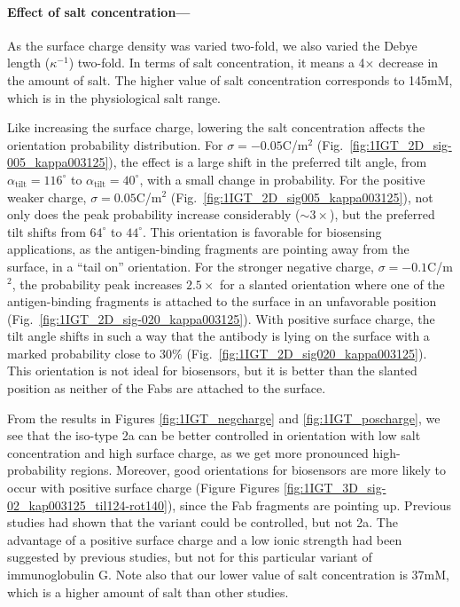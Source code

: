  \medskip
 
 \paragraph*{Effect of salt concentration---}
 
As the surface charge density was varied two-fold, we also varied the Debye length ($\kappa^{-1}$) two-fold. In terms of salt concentration, it means a 4$\times$ decrease in the amount of salt. The higher value of salt concentration corresponds to 145mM, which is in the physiological salt range.  
 
Like increasing the surface charge, lowering the salt concentration affects the orientation probability distribution. 
 For $\sigma=-0.05$C/m$^2$ (Fig.~\ref{fig:1IGT_2D_sig-005_kappa003125}), the effect is a large shift in the preferred tilt angle, from $\alpha_\text{tilt}=116^\circ$ to $\alpha_\text{tilt}=40^\circ$, with a small change in probability. 
For the positive weaker charge, $\sigma=0.05$C/m$^2$ (Fig.~\ref{fig:1IGT_2D_sig005_kappa003125}), not only does the peak probability increase considerably ($\sim 3\times$), but the preferred tilt shifts from $64^{\circ}$ to $44^{\circ}$.
This orientation is favorable for biosensing applications, as the antigen-binding fragments are pointing away from the surface, in a ``tail on'' orientation.
 For the stronger negative charge, $\sigma=-0.1$C/m$^2$, the probability peak increases  $2.5\times$ for a slanted orientation where one of the antigen-binding fragments is attached to the surface in an unfavorable position (Fig.~\ref{fig:1IGT_2D_sig-020_kappa003125}).
 With positive surface charge, the tilt angle shifts in such a way that the antibody is lying on the surface with a marked probability close to $30\%$ (Fig.~\ref{fig:1IGT_2D_sig020_kappa003125}).
 This orientation is not ideal for biosensors, but it is better than the slanted position as neither of the Fabs are attached to the surface.

From the results in Figures \ref{fig:1IGT_negcharge} and \ref{fig:1IGT_poscharge}, we see that the iso-type \ig 2a can be better controlled in orientation with low salt concentration and high surface charge, as we get more pronounced high-probability regions. 
Moreover, good orientations for biosensors are more likely to occur with positive surface charge (Figure Figures \ref{fig:1IGT_3D_sig-02_kap003125_til124-rot140}), since the Fab fragments are pointing up.
Previous studies had shown that the  variant could be controlled, but not \ig 2a. 
The advantage of a positive surface charge and a low ionic strength had been suggested by previous studies, but not for this particular variant of immunoglobulin G. Note also that our lower value of salt concentration is 37mM, which is a higher amount of salt than other studies.\cite{BuijsETal1997,ChenLiuZhouJiang2003}


